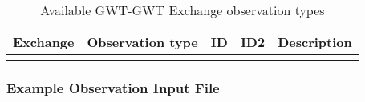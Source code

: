 \begin{longtable}{p{2cm} p{2.75cm} p{2cm} p{1.25cm} p{7cm}}
\caption{Available GWT-GWT Exchange observation types} \tabularnewline

\hline
\hline
\textbf{Exchange} & \textbf{Observation type} & \textbf{ID} & \textbf{ID2} & \textbf{Description} \\
\hline
\endhead

\hline
\endfoot


\label{table:gwt-gwtobstype}
\end{longtable}


\vspace{5mm}
\subsubsection{Example Observation Input File}


